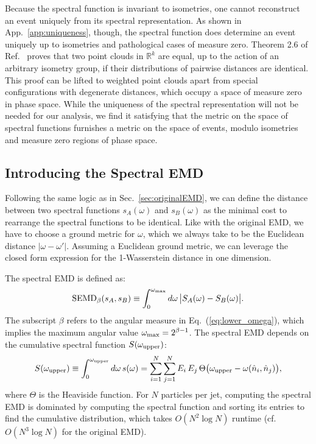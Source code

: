 \documentclass[letterpaper,11pt]{article}
\DeclareRobustCommand{\Sec}[1]{Sec.~\ref{#1}}
\DeclareRobustCommand{\App}[1]{App.~\ref{#1}}
\DeclareRobustCommand{\Eq}[1]{Eq.~(\ref{#1})}
\DeclareRobustCommand{\InRef}[1]{Ref.~\cite{#1}}
\begin{document}
Because the spectral function is invariant to isometries, one cannot reconstruct an event uniquely from its spectral representation.
%
As shown in \App{app:uniqueness}, though, the spectral function does determine an event uniquely up to isometries and pathological cases of measure zero.
%
Theorem 2.6 of \InRef{BOUTIN2004709} proves that two point clouds in $\mathbb{R}^k$ are equal, up to the action of an arbitrary isometry group, if their distributions of pairwise distances are identical.
%
This proof can be lifted to weighted point clouds apart from special configurations with degenerate distances, which occupy a space of measure zero in phase space.
%
While the uniqueness of the spectral representation will not be needed for our analysis, we find it satisfying that the metric on the space of spectral functions furnishes a metric on the space of events, modulo isometries and measure zero regions of phase space.

\subsection{Introducing the Spectral EMD}


Following the same logic as in \Sec{sec:originalEMD}, we can define the distance between two spectral functions $s_A(\omega)$ and $s_B(\omega)$ as the minimal cost to rearrange the spectral functions to be identical.
%
Like with the original EMD, we have to choose a ground metric for $\omega$, which we always take to be the Euclidean distance $|\omega - \omega'|$.
%
Assuming a Euclidean ground metric, we can leverage the closed form expression for the 1-Wasserstein distance in one dimension.


The spectral EMD is defined as:
%
\begin{equation}
\label{eq:SEMD_def}
\text{SEMD}_{\beta}(s_A, s_B) \equiv \int_0^{\omega_{\rm max}} d \omega  \, \big| S_A(\omega) - S_B(\omega) \big| .
\end{equation}
%
The subscript $\beta$ refers to the angular measure in \Eq{eq:lower_omega}, which implies the maximum angular value $\omega_{\rm max} = 2^{\beta -1}$.
%
The spectral EMD depends on the cumulative spectral function $S(\omega_{\rm upper})$:
%
\begin{align}
S(\omega_{\rm upper}) \equiv \int_0^{\omega_{\rm upper}} d\omega \, s(\omega) = \sum_{i =  1}^N  \sum_{j=  1}^N E_i \, E_j\, \Theta\big(\omega_{\rm upper}-\omega(\hat{n}_i,\hat{n}_j) \big),
\end{align}
%
where $\Theta$ is the Heaviside function.
%
For $N$ particles per jet, computing the spectral EMD is dominated by computing the spectral function and sorting its entries to find the cumulative distribution, which takes $O(N^2 \log N)$ runtime (cf.~$O(N^3 \log N)$ for the original EMD).
\end{document}
